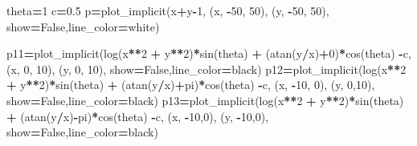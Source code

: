 \documentclass[
]{book}
\newenvironment{Shaded}{\begin{snugshade}}{\end{snugshade}}
\newcommand{\DecValTok}[1]{\textcolor[rgb]{0.00,0.00,0.81}{#1}}
\newcommand{\FloatTok}[1]{\textcolor[rgb]{0.00,0.00,0.81}{#1}}
\newcommand{\NormalTok}[1]{#1}
\newcommand{\OperatorTok}[1]{\textcolor[rgb]{0.81,0.36,0.00}{\textbf{#1}}}
\newcommand{\StringTok}[1]{\textcolor[rgb]{0.31,0.60,0.02}{#1}}
\newcommand{\VariableTok}[1]{\textcolor[rgb]{0.00,0.00,0.00}{#1}}
\theoremstyle{definition}
\theoremstyle{definition}
\theoremstyle{definition}
\theoremstyle{definition}
\theoremstyle{remark}
\begin{document}
\begin{Shaded}
\begin{Highlighting}[]
\NormalTok{theta}\OperatorTok{=}\DecValTok{1}
\NormalTok{c}\OperatorTok{=}\FloatTok{0.5}
\NormalTok{p}\OperatorTok{=}\NormalTok{plot\_implicit(x}\OperatorTok{+}\NormalTok{y}\OperatorTok{{-}}\DecValTok{1}\NormalTok{,}
\NormalTok{(x, }\OperatorTok{{-}}\DecValTok{50}\NormalTok{, }\DecValTok{50}\NormalTok{), (y, }\OperatorTok{{-}}\DecValTok{50}\NormalTok{, }\DecValTok{50}\NormalTok{), show}\OperatorTok{=}\VariableTok{False}\NormalTok{,line\_color}\OperatorTok{=}\StringTok{\textquotesingle{}white\textquotesingle{}}\NormalTok{)}

\NormalTok{p11}\OperatorTok{=}\NormalTok{plot\_implicit(log(x}\OperatorTok{**}\DecValTok{2} \OperatorTok{+}\NormalTok{ y}\OperatorTok{**}\DecValTok{2}\NormalTok{)}\OperatorTok{*}\NormalTok{sin(theta) }\OperatorTok{+}\NormalTok{ (atan(y}\OperatorTok{/}\NormalTok{x)}\OperatorTok{+}\DecValTok{0}\NormalTok{)}\OperatorTok{*}\NormalTok{cos(theta) }\OperatorTok{{-}}\NormalTok{c,}
\NormalTok{(x, }\DecValTok{0}\NormalTok{, }\DecValTok{10}\NormalTok{), (y, }\DecValTok{0}\NormalTok{, }\DecValTok{10}\NormalTok{), show}\OperatorTok{=}\VariableTok{False}\NormalTok{,line\_color}\OperatorTok{=}\StringTok{\textquotesingle{}black\textquotesingle{}}\NormalTok{)}
\NormalTok{p12}\OperatorTok{=}\NormalTok{plot\_implicit(log(x}\OperatorTok{**}\DecValTok{2} \OperatorTok{+}\NormalTok{ y}\OperatorTok{**}\DecValTok{2}\NormalTok{)}\OperatorTok{*}\NormalTok{sin(theta) }\OperatorTok{+}\NormalTok{ (atan(y}\OperatorTok{/}\NormalTok{x)}\OperatorTok{+}\NormalTok{pi)}\OperatorTok{*}\NormalTok{cos(theta) }\OperatorTok{{-}}\NormalTok{c,}
\NormalTok{(x, }\OperatorTok{{-}}\DecValTok{10}\NormalTok{, }\DecValTok{0}\NormalTok{), (y, }\DecValTok{0}\NormalTok{,}\DecValTok{10}\NormalTok{), show}\OperatorTok{=}\VariableTok{False}\NormalTok{,line\_color}\OperatorTok{=}\StringTok{\textquotesingle{}black\textquotesingle{}}\NormalTok{)}
\NormalTok{p13}\OperatorTok{=}\NormalTok{plot\_implicit(log(x}\OperatorTok{**}\DecValTok{2} \OperatorTok{+}\NormalTok{ y}\OperatorTok{**}\DecValTok{2}\NormalTok{)}\OperatorTok{*}\NormalTok{sin(theta) }\OperatorTok{+}\NormalTok{ (atan(y}\OperatorTok{/}\NormalTok{x)}\OperatorTok{{-}}\NormalTok{pi)}\OperatorTok{*}\NormalTok{cos(theta) }\OperatorTok{{-}}\NormalTok{c,}
\NormalTok{(x,  }\OperatorTok{{-}}\DecValTok{10}\NormalTok{,}\DecValTok{0}\NormalTok{), (y, }\OperatorTok{{-}}\DecValTok{10}\NormalTok{,}\DecValTok{0}\NormalTok{), show}\OperatorTok{=}\VariableTok{False}\NormalTok{,line\_color}\OperatorTok{=}\StringTok{\textquotesingle{}black\textquotesingle{}}\NormalTok{)}

\end{Highlighting}
\end{Shaded}
\end{document}
